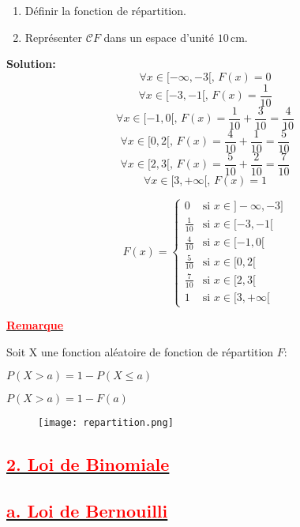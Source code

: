 \documentclass[12pt]{article}
\begin{document}
\begin{enumerate}
    \item Définir la fonction de répartition.
    \item Représenter \( \mathcal{C}F \) dans un espace d’unité \( 10 \, \text{cm} \).
\end{enumerate}

\textbf{Solution:} \\

\[
\forall x \in  [-\infty, -3[, \, F( x ) = 0
\]
\[
\forall x \in [-3, -1[, \, F( x ) = \frac{1}{10}
\]
\[
\forall x \in [-1, 0[, \, F( x ) = \frac{1}{10} + \frac{3}{10} = \frac{4}{10}
\]
\[
\forall x \in [0, 2[, \, F( x ) = \frac{4}{10} + \frac{1}{10} = \frac{5}{10}
\]
\[
\forall x \in [2, 3[, \, F( x ) = \frac{5}{10} + \frac{2}{10} = \frac{7}{10}
\]
\[
\forall x \in [3, +\infty[, \, F( x ) = 1
\]

\[
F(x) =
\begin{cases}
0 & \text{si } x \in  ]-\infty, -3] \\
\frac{1}{10} & \text{si } x \in [-3, -1[ \\
\frac{4}{10} & \text{si } x \in [-1, 0[ \\
\frac{5}{10} & \text{si } x \in [0, 2[ \\
\frac{7}{10} & \text{si } x \in [2, 3[ \\
1 & \text{si } x \in [3, +\infty[
\end{cases}
\]

\underline{\textbf{\textcolor{red}{Remarque}}}

Soit X une fonction aléatoire de fonction de répartition \( F: \)

$P(X > a) = 1 - P(X \leq a)$

$P(X > a) = 1 - F(a)$

\begin{figure}[h!]
    \centering
    \texttt{[image: repartition.png]} %
    \label{fig:courbe_f}
\end{figure}


\subsection*{\underline{\textbf{\textcolor{red}{2. Loi de Binomiale}}}}

\subsection*{\underline{\textbf{\textcolor{red}{a. Loi de Bernouilli}}}}
\end{document}

